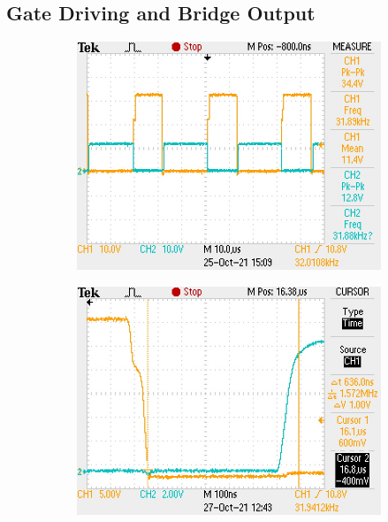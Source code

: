 \documentclass[11pt]{article}
\begin{document}
{\subsection{Gate Driving and Bridge Output}
\begin{figure}[h!]
  \centering
  \begin{subfigure}{0.3\textwidth}
      \includegraphics[width=\columnwidth]{img/testing/power_output/gate_input.JPG}
  \end{subfigure}
  \begin{subfigure}{0.3\textwidth}
      \includegraphics[width=\columnwidth]{img/testing/power_output/dead_time.JPG}
  \end{subfigure}

\end{figure}}
\end{document}
